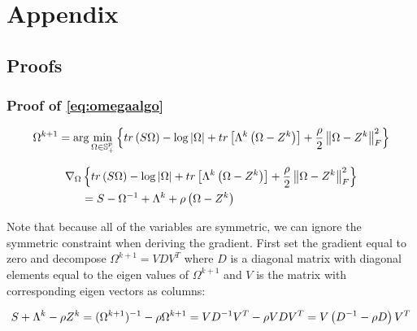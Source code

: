 \documentclass[11pt,]{report}
\begin{document}
\hypertarget{appendix-appendix}{%
\appendix}


\hypertarget{appendix}{%
\chapter{Appendix}\label{appendix}}

\hypertarget{proofs}{%
\section{Proofs}\label{proofs}}

\hypertarget{proofomegaalgo}{%
\subsection{Proof of \eqref{eq:omegaalgo}}\label{proofomegaalgo}}

\begin{equation}
\Omega^{k + 1} = \arg\min_{\Omega \in \mathbb{S}_{+}^{p}}\left\{ tr\left(S\Omega\right) - \log\left|\Omega\right| + tr\left[\Lambda^{k}\left(\Omega - Z^{k}\right)\right] + \frac{\rho}{2}\left\| \Omega - Z^{k} \right\|_{F}^{2} \right\}
\label{eq:appendixomegaloglik}\notag
\end{equation}

\begin{equation}
\begin{split}
  \nabla_{\Omega}&\left\{ tr\left(S\Omega\right) - \log\left|\Omega\right| + tr\left[\Lambda^{k}\left(\Omega - Z^{k}\right)\right] + \frac{\rho}{2}\left\| \Omega - Z^{k} \right\|_{F}^{2} \right\} \\
  &= S - \Omega^{-1} + \Lambda^{k} + \rho\left( \Omega - Z^{k} \right)
\label{eq:appendixomegagradient}\notag
\end{split}
\end{equation}

Note that because all of the variables are symmetric, we can ignore the symmetric constraint when deriving the gradient. First set the gradient equal to zero and decompose \(\Omega^{k + 1} = VDV^{T}\) where \(D\) is a diagonal matrix with diagonal elements equal to the eigen values of \(\Omega^{k + 1}\) and \(V\) is the matrix with corresponding eigen vectors as columns:

\begin{equation}
S + \Lambda^{k} - \rho Z^{k} = (\Omega^{k + 1})^{-1} - \rho \Omega^{k + 1} = VD^{-1}V^{T} - \rho VDV^{T} =  V\left(D^{-1} - \rho D\right)V^{T}\notag
\end{equation}
\end{document}
